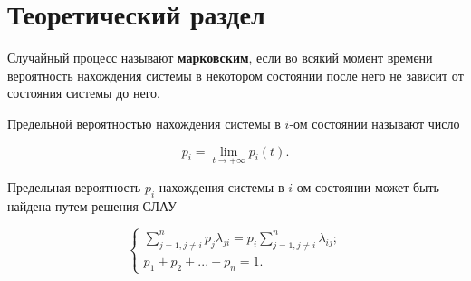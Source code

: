 \chapter{Теоретический раздел}

Случайный процесс называют \textbf{марковским}, если во всякий момент времени вероятность нахождения системы в некотором состоянии после него не зависит от состояния системы до него.

Предельной вероятностью нахождения системы в $i$-ом состоянии называют
число

\begin{equation}
	p_i = \lim_{t \rightarrow +\infty} p_i(t).
\end{equation}

Предельная вероятность $p_i$ нахождения системы в $i$-ом состоянии
может быть найдена путем решения СЛАУ

\begin{equation}
	\begin{cases}
        \sum_{j = 1, j \ne i}^n p_j \lambda_{ji}
            = p_i \sum_{j = 1, j \ne i}^n \lambda_{ij}; \\
        p_1 + p_2 + ... + p_n = 1.
    \end{cases}
\end{equation}
